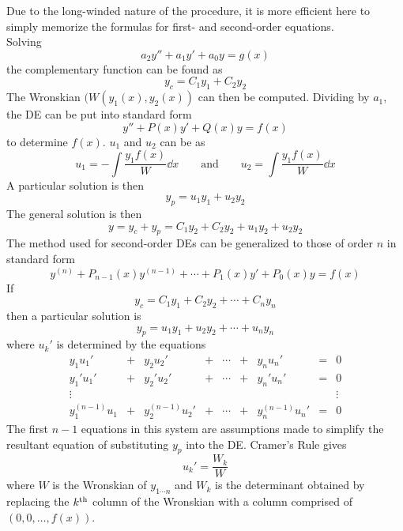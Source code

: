 \documentclass[./Differential Equations]{subfiles}
\begin{document}
			Due to the long-winded nature of the procedure, it is more efficient here to simply memorize the formulas for first- and second-order equations. \\
			Solving
				\[a_2y'' + a_1y' + a_0y = g(x)\]
				the complementary function can be found as
				\[y_c = C_1y_1 + C_2y_2\]
				The Wronskian \((W(y_1(x), y_2(x))\) can then be computed. Dividing by \(a_1\), the DE can be put into standard form
				\[y'' + P(x)y' + Q(x)y = f(x)\]	
				to determine \(f(x)\). \(u_1\) and \(u_2\) can be as
				\[
					u_1 = -\int \frac{y_1f(x)}{W} \dd{x} \qquad \text{and} \qquad
						u_2 = \int \frac{y_1f(x)}{W} \dd{x}
				\]
				A particular solution is then
				\[y_p = u_1y_1 + u_2y_2\]
				The general solution is then
				\[
					y = y_c + y_p
						= C_1y_2 + C_2y_2 + u_1y_2 + u_2y_2
				\]
			The method used for second-order DEs can be generalized to those of order \(n\) in standard form
				\[y^{(n)} + P_{n - 1}(x)y^{(n - 1)} + \cdots + P_1(x)y' + P_0(x)y = f(x)\]
				If
				\[y_c = C_1y_1 + C_2y_2 + \cdots + C_ny_n\]
				then a particular solution is
				\[y_p = u_1y_1 + u_2y_2 + \cdots + u_ny_n\]
				where \(u_k'\) is determined by the equations
				\[
					\begin{array}{ccccccccc}
						y_1u_1' &+ &y_2u_2' &+ &\cdots &+ & y_nu_n' &= &0 \\
						y_1'u_1' &+ & y_2'u_2' &+ &\cdots &+ & y_n'u_n' &= &0 \\
						\vdots &&&&&&&& \vdots \\
						y_1^{(n - 1)}u_1 &+ & y_2^{(n - 1)}u_2' &+ &\cdots &+ & y_n^{(n - 1)}u_n' &= &0
					\end{array}
				\]
				The first \(n - 1\) equations in this system are assumptions made to simplify the resultant equation of substituting \(y_p\) into the DE. Cramer's Rule gives
				\[u_k' = \frac{W_k}{W}\]
				where \(W\) is the Wronskian of \(y_{1 \cdots n}\) and \(W_k\) is the determinant obtained by replacing the \(k^{\text{th}}\) column of the Wronskian with a column comprised of \((0, 0, \ldots, f(x))\).
\end{document}

